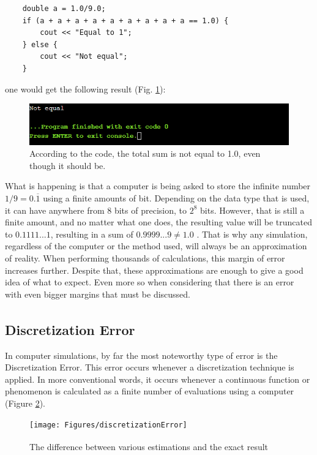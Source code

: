 \begin{verbatim}
	double a = 1.0/9.0;
	if (a + a + a + a + a + a + a + a + a == 1.0) {
		cout << "Equal to 1";
	} else {
		cout << "Not equal";
	}
\end{verbatim}

one would get the following result (Fig. \ref{fig:finiteprecision}): 
\begin{figure}[h!]
	\centering
	\includegraphics{Figures/finiteprecision}
	\decoRule
	\caption[Code Result]{According to the code, the total sum is not equal to 1.0, even though it should be.}
	\label{fig:finiteprecision}
\end{figure}

What is happening is that a computer is being asked to store the infinite number $1/9 = 0.\overline{1}$ using a finite amounts of bit. Depending on the data type that is used, it can have anywhere from 8 bits of precision, to $2^8$ bits. However, that is still a finite amount, and no matter what one does, the resulting value will be truncated to $0.1111...1$, resulting in a sum of $0.9999...9 \neq 1.0$ . That is why any simulation, regardless of the computer or the method used, will always be an approximation of reality. When performing thousands of calculations, this margin of error increases further. Despite that, these approximations are enough to give a good idea of what to expect. Even more so when considering that there is an error with even bigger margins that must be discussed.

\subsection{Discretization Error\textsuperscript{\cite{roy2010review}}}

In computer simulations, by far the most noteworthy type of error is the Discretization Error. This error occurs whenever a discretization technique is applied. In more conventional words, it occurs whenever a continuous function or phenomenon is calculated as a finite number of evaluations using a  computer (Figure \ref{fig:discretizationError}).

\begin{figure}[h!]
	\centering
	\texttt{[image: Figures/discretizationError]}
	\decoRule
	\caption[Discretization Error]{The difference between various estimations and the exact result\textsuperscript{\cite{dow_1998}}}
	\label{fig:discretizationError}
\end{figure}

